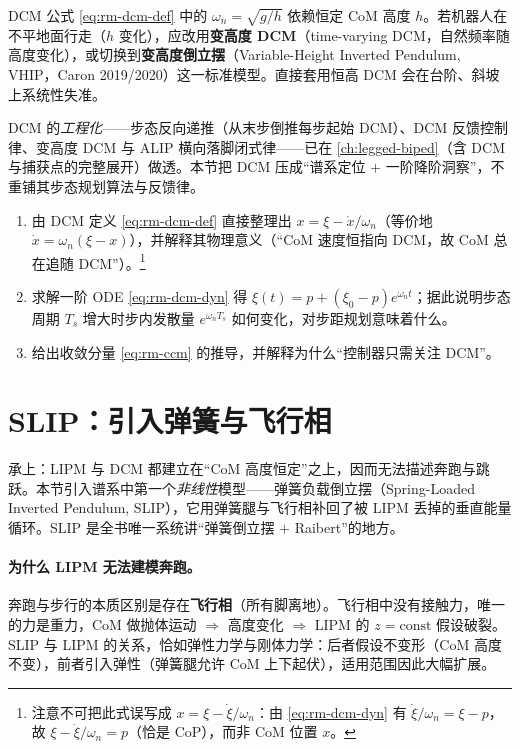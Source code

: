 \begin{pitfall}
DCM 公式 \cref{eq:rm-dcm-def} 中的 $\omega_n=\sqrt{g/h}$ 依赖恒定 CoM 高度 $h$。若机器人在不平地面行走（$h$ 变化），应改用\textbf{变高度 DCM}（time-varying DCM，自然频率随高度变化），或切换到\textbf{变高度倒立摆}（Variable-Height Inverted Pendulum, VHIP，Caron 2019/2020\cite{caron2019capturability}）这一标准模型。直接套用恒高 DCM 会在台阶、斜坡上系统性失准。
\end{pitfall}

\begin{note}
DCM 的\emph{工程化}——步态反向递推（从末步倒推每步起始 DCM）、DCM 反馈控制律、变高度 DCM 与 ALIP 横向落脚闭式律——已在 \cref{ch:legged-biped}（含 DCM 与捕获点的完整展开）做透。本节把 DCM 压成“谱系定位 $+$ 一阶降阶洞察”，不重铺其步态规划算法与反馈律。
\end{note}

\begin{exercise}
\begin{enumerate}
  \item 由 DCM 定义 \cref{eq:rm-dcm-def} 直接整理出 $x=\xi-\dot{x}/\omega_n$（等价地 $\dot{x}=\omega_n(\xi-x)$），并解释其物理意义（“CoM 速度恒指向 DCM，故 CoM 总在追随 DCM”）。\footnote{注意不可把此式误写成 $x=\xi-\dot{\xi}/\omega_n$：由 \cref{eq:rm-dcm-dyn} 有 $\dot{\xi}/\omega_n=\xi-p$，故 $\xi-\dot{\xi}/\omega_n=p$（恰是 CoP），而非 CoM 位置 $x$。}
  \item 求解一阶 ODE \cref{eq:rm-dcm-dyn} 得 $\xi(t)=p+(\xi_0-p)e^{\omega_n t}$；据此说明步态周期 $T_s$ 增大时步内发散量 $e^{\omega_n T_s}$ 如何变化，对步距规划意味着什么。
  \item 给出收敛分量 \cref{eq:rm-ccm} 的推导，并解释为什么“控制器只需关注 DCM”。
\end{enumerate}
\end{exercise}

\section{SLIP：引入弹簧与飞行相}
\label{sec:rm-slip}

承上：LIPM 与 DCM 都建立在“CoM 高度恒定”之上，因而无法描述奔跑与跳跃。本节引入谱系中第一个\emph{非线性}模型——弹簧负载倒立摆（Spring-Loaded Inverted Pendulum, SLIP），它用弹簧腿与飞行相补回了被 LIPM 丢掉的垂直能量循环。SLIP 是全书唯一系统讲“弹簧倒立摆 $+$ Raibert”的地方。

\paragraph{为什么 LIPM 无法建模奔跑。}
奔跑与步行的本质区别是存在\textbf{飞行相}（所有脚离地）。飞行相中没有接触力，唯一的力是重力，CoM 做抛体运动 $\Rightarrow$ 高度变化 $\Rightarrow$ LIPM 的 $z=\mathrm{const}$ 假设破裂。SLIP 与 LIPM 的关系，恰如弹性力学与刚体力学：后者假设不变形（CoM 高度不变），前者引入弹性（弹簧腿允许 CoM 上下起伏），适用范围因此大幅扩展。

